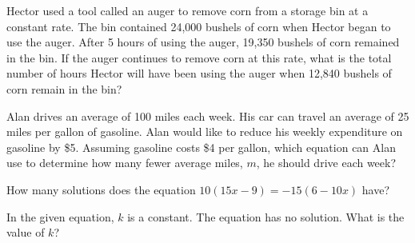 \noindent\markforreview
\vspace{1em}


Hector used a tool called an auger to remove corn from a storage bin at a constant rate. The bin contained 24,000 bushels of corn when Hector began to use the auger. After 5 hours of using the auger, 19,350 bushels of corn remained in the bin. If the auger continues to remove corn at this rate, what is the total number of hours Hector will have been using the auger when 12,840 bushels of corn remain in the bin?

\vspace{0.75em}





\vspace{2em}

\noindent\markforreview

\vspace{1em}

Alan drives an average of 100 miles each week. His car can travel an average of 25 miles per gallon of gasoline. Alan would like to reduce his weekly expenditure on gasoline by \$5. Assuming gasoline costs \$4 per gallon, which equation can Alan use to determine how many fewer average miles, \( m \), he should drive each week?

\vspace{0.75em}





\newpage

\noindent\markforreview
\vspace{1em}

How many solutions does the equation \( 10(15x - 9) = -15(6 - 10x) \) have?

\vspace{0.75em}




\vspace{2em}

\noindent\markforreview

In the given equation, \( k \) is a constant. The equation has no solution. What is the value of \( k \)?

